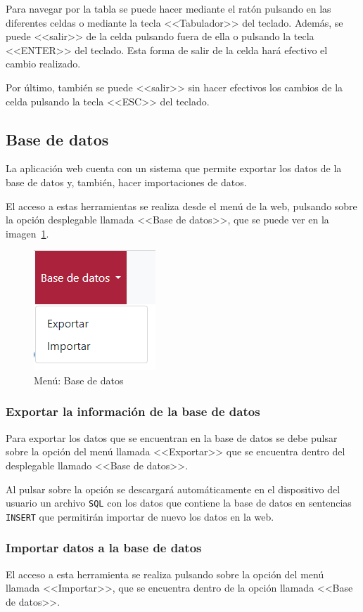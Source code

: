 Para navegar por la tabla se puede hacer mediante el ratón pulsando en las diferentes celdas o mediante la tecla <<Tabulador>> del teclado. Además, se puede <<salir>> de la celda pulsando fuera de ella o pulsando la tecla <<ENTER>> del teclado.
Esta forma de salir de la celda hará efectivo el cambio realizado.

Por último, también se puede <<salir>> sin hacer efectivos los cambios de la celda pulsando la tecla <<ESC>> del teclado.

\subsection{Base de datos}
La aplicación web cuenta con un sistema que permite exportar los datos de la base de datos y, también, hacer importaciones de datos.

El acceso a estas herramientas se realiza desde el menú de la web, pulsando sobre la opción desplegable llamada <<Base de datos>>, que se puede ver en la imagen~\ref{pag:menu bd}.

\begin{figure}
	\centering
	\includegraphics[width=.35\textwidth]{../img/Anexos/Manual usuario/menu bd.png}
	\caption{Menú: Base de datos}\label{pag:menu bd}
\end{figure}

\subsubsection{Exportar la información de la base de datos}
Para exportar los datos que se encuentran en la base de datos se debe pulsar sobre la opción del menú llamada <<Exportar>> que se encuentra dentro del desplegable llamado <<Base de datos>>.

Al pulsar sobre la opción se descargará automáticamente en el dispositivo del usuario un archivo \texttt{SQL} con los datos que contiene la base de datos en sentencias \texttt{INSERT} que permitirán importar de nuevo los datos en la web.

\subsubsection{Importar datos a la base de datos}
El acceso a esta herramienta se realiza pulsando sobre la opción del menú llamada <<Importar>>, que se encuentra dentro de la opción llamada <<Base de datos>>.

